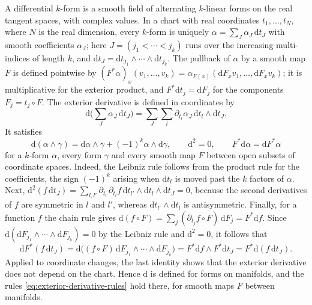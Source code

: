 A differential $k$-form is a smooth field of alternating $k$-linear forms on the real tangent spaces, with complex values. In a chart with real coordinates $t_1,\ldots,t_N$, where $N$ is the real dimension, every $k$-form is uniquely $\alpha=\sum_J\alpha_J\,\mathrm dt_J$ with smooth coefficients $\alpha_J$; here $J=(j_1<\cdots<j_k)$ runs over the increasing multi-indices of length $k$, and $\mathrm dt_J=\mathrm dt_{j_1}\wedge\cdots\wedge\mathrm dt_{j_k}$. The pullback of $\alpha$ by a smooth map $F$ is defined pointwise by $(F^*\alpha)_x(v_1,\ldots,v_k)=\alpha_{F(x)}(\mathrm dF_xv_1,\ldots,\mathrm dF_xv_k)$; it is multiplicative for the exterior product, and $F^*\mathrm dt_j=\mathrm dF_j$ for the components $F_j=t_j\circ F$. The exterior derivative is defined in coordinates by
\[
 \mathrm d\Big(\sum_J\alpha_J\,\mathrm dt_J\Big)=\sum_J\sum_l\partial_{t_l}\alpha_J\,\mathrm dt_l\wedge\mathrm dt_J.
\]
It satisfies
\begin{equation}\label{eq:exterior-derivative-rules}
 \mathrm{d}(\alpha\wedge\gamma)=\mathrm{d}\alpha\wedge\gamma+(-1)^k\alpha\wedge\mathrm{d}\gamma,
 \qquad \mathrm{d}^2=0,\qquad F^*\mathrm d\alpha=\mathrm dF^*\alpha
\end{equation}
for a $k$-form $\alpha$, every form $\gamma$ and every smooth map $F$ between open subsets of coordinate spaces. Indeed, the Leibniz rule follows from the product rule for the coefficients, the sign $(-1)^k$ arising when $\mathrm dt_l$ is moved past the $k$ factors of $\alpha$. Next, $\mathrm d^2(f\,\mathrm dt_J)=\sum_{l,l'}\partial_{t_{l'}}\partial_{t_l}f\,\mathrm dt_{l'}\wedge\mathrm dt_l\wedge\mathrm dt_J=0$, because the second derivatives of $f$ are symmetric in $l$ and $l'$, whereas $\mathrm dt_{l'}\wedge\mathrm dt_l$ is antisymmetric. Finally, for a function $f$ the chain rule gives $\mathrm d(f\circ F)=\sum_j(\partial_{t_j}f\circ F)\,\mathrm dF_j=F^*\mathrm df$. Since $\mathrm d(\mathrm dF_{j_1}\wedge\cdots\wedge\mathrm dF_{j_k})=0$ by the Leibniz rule and $\mathrm d^2=0$, it follows that
\[
 \mathrm dF^*(f\,\mathrm dt_J)=\mathrm d\big((f\circ F)\,\mathrm dF_{j_1}\wedge\cdots\wedge\mathrm dF_{j_k}\big)=F^*\mathrm df\wedge F^*\mathrm dt_J=F^*\mathrm d(f\,\mathrm dt_J).
\]
Applied to coordinate changes, the last identity shows that the exterior derivative does not depend on the chart. Hence $\mathrm d$ is defined for forms on manifolds, and the rules \eqref{eq:exterior-derivative-rules} hold there, for smooth maps $F$ between manifolds.


